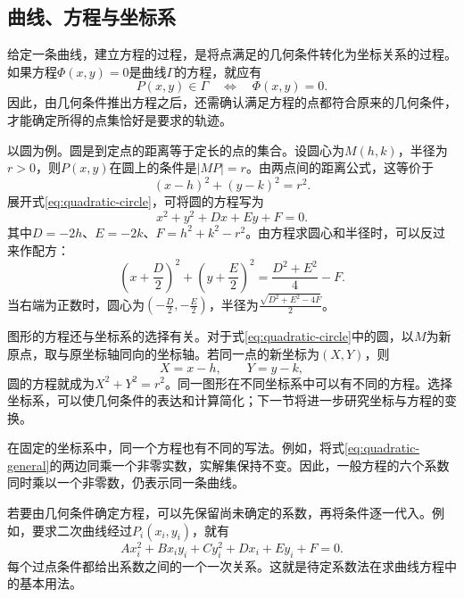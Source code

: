 \subsection{曲线、方程与坐标系}
\label{subsec:quadratic-curves-and-coordinates}

给定一条曲线，建立方程的过程，是将点满足的几何条件转化为坐标关系的过程。如果方程\(\Phi(x,y) = 0\)是曲线\(\Gamma\)的方程，就应有
\begin{equation}
    P(x,y) \in \Gamma \quad\Longleftrightarrow\quad \Phi(x,y) = 0 .
\end{equation}
因此，由几何条件推出方程之后，还需确认满足方程的点都符合原来的几何条件，才能确定所得的点集恰好是要求的轨迹。

以圆为例。圆是到定点的距离等于定长的点的集合。设圆心为\(M(h,k)\)，半径为\(r > 0\)，则\(P(x,y)\)在圆上的条件是\(|MP| = r\)。由两点间的距离公式，这等价于
\begin{equation}\label{eq:quadratic-circle}
    (x-h)^{2} + (y-k)^{2} = r^{2} .
\end{equation}
展开式\eqref{eq:quadratic-circle}，可将圆的方程写为
\begin{equation}
    x^{2} + y^{2} + D x + E y + F = 0 .
\end{equation}
其中\(D = -2h\)、\(E = -2k\)、\(F = h^{2} + k^{2} - r^{2}\)。由方程求圆心和半径时，可以反过来作配方：
\begin{equation}
    \left(x + \frac{D}{2}\right)^{2}
    + \left(y + \frac{E}{2}\right)^{2}
    = \frac{D^{2} + E^{2}}{4} - F .
\end{equation}
当右端为正数时，圆心为\(\left(-\frac{D}{2},-\frac{E}{2}\right)\)，半径为\(\frac{\sqrt{D^{2}+E^{2}-4F}}{2}\)。

图形的方程还与坐标系的选择有关。对于式\eqref{eq:quadratic-circle}中的圆，以\(M\)为新原点，取与原坐标轴同向的坐标轴。若同一点的新坐标为\((X,Y)\)，则
\begin{equation}
    X = x - h , \qquad Y = y - k ,
\end{equation}
圆的方程就成为\(X^{2} + Y^{2} = r^{2}\)。同一图形在不同坐标系中可以有不同的方程。选择坐标系，可以使几何条件的表达和计算简化；下一节将进一步研究坐标与方程的变换。

在固定的坐标系中，同一个方程也有不同的写法。例如，将式\eqref{eq:quadratic-general}的两边同乘一个非零实数，实解集保持不变。因此，一般方程的六个系数同时乘以一个非零数，仍表示同一条曲线。

若要由几何条件确定方程，可以先保留尚未确定的系数，再将条件逐一代入。例如，要求二次曲线经过\(P_i(x_i,y_i)\)，就有
\begin{equation}
    A x_i^{2} + B x_i y_i + C y_i^{2} + D x_i + E y_i + F = 0 .
\end{equation}
每个过点条件都给出系数之间的一个一次关系。这就是{\heiti{}待定系数法}在求曲线方程中的基本用法。


